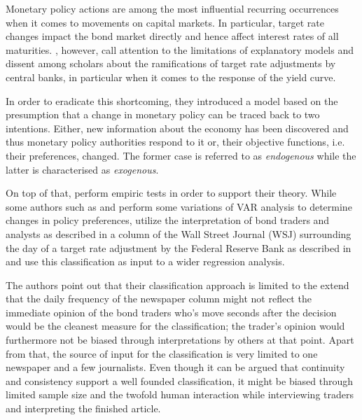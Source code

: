
Monetary policy actions are among the most influential recurring occurrences when it comes to movements on capital markets. In particular, target rate changes impact the bond market directly and hence affect interest rates of all maturities. \textcite{Ellingsen.2001}, however, call attention to the limitations of explanatory models and dissent among scholars about the ramifications of target rate adjustments by central banks, in particular when it comes to the response of the yield curve. 

In order to eradicate this shortcoming, they introduced a model based on the presumption that a change in monetary policy can be traced back to two intentions. Either, new information about the economy has been discovered and thus monetary policy authorities respond to it or, their objective functions, i.e. their preferences, changed. The former case is referred to as \textit{endogenous} while the latter is characterised as \textit{exogenous}.

On top of that, \textcite{Ellingsen.2001} perform empiric tests in order to support their theory. While some authors such as \textcite{Peersman.2002} and \textcite{Evans.1998} perform some variations of VAR analysis to determine changes in policy preferences, \textcite{Ellingsen.2001} utilize the interpretation of bond traders and analysts as described in a column of the Wall Street Journal (WSJ) surrounding the day of a target rate adjustment by the Federal Reserve Bank as described in \textcite{Ellingsen.2003} and use this classification as input to a wider regression analysis.

The authors point out that their classification approach is limited to the extend that the daily frequency of the newspaper column might not reflect the immediate opinion of the bond traders who's move seconds after the decision would be the cleanest measure for the classification; the trader's opinion would furthermore not be biased through interpretations by others at that point. Apart from that, the source of input for the classification is very limited to one newspaper and a few journalists. Even though it can be argued that continuity and consistency support a well founded classification, it might be biased through limited sample size and the twofold human interaction while interviewing traders and interpreting the finished article. 

